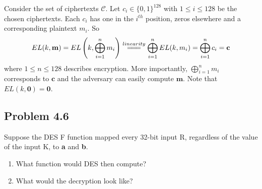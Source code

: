 \documentclass[../hw_sols.tex]{subfiles}
\begin{document}
\begin{solution}
Consider the set of ciphertexts $\mathcal{C}$. Let $c_i \in \{0,1\}^{128}$ 
with $1 \leq i \leq 128$ be the chosen ciphertexts.  Each $c_i$ has one in 
the $i^{th}$ position, zeros elsewhere and a corresponding plaintext $m_i$. So
	$$EL(k,\mathbf{m}) 
	= EL \left( k, \bigoplus_{i=1}^n m_i \right) 
	\stackrel{linearity}{=\joinrel=\joinrel=} \bigoplus_{i=1}^n EL(k,m_i) 
	= \bigoplus_{i=1}^n c_i 
	= \mathbf{c}$$
where $1 \leq n \leq 128$ describes encryption. More importantly, 
$\displaystyle \bigoplus_{i=1}^n m_i$ corresponds to $\mathbf{c}$ and the 
adversary can easily compute $\mathbf{m}$. Note that 
$EL(k,\mathbf{0}) = \mathbf{0}$.
\end{solution}


\newpage



\subsection*{Problem 4.6}

Suppose the DES F function mapped every 32-bit input R, regardless of the value 
of the input K, to \textbf{a} and \textbf{b}.
\begin{enumerate}
	\item What function would DES then compute?
	\item What would the decryption look like?
\end{enumerate}
\end{document}
